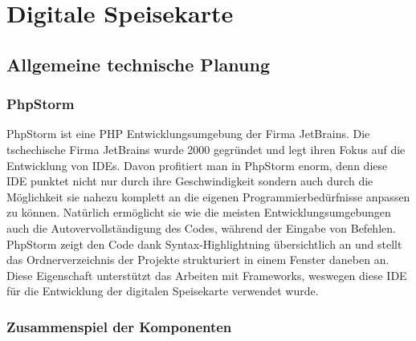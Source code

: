 \chapter{Digitale Speisekarte}
\renewcommand{\kapitelautor}{Autor: Katharina Joksch}

\section{Allgemeine technische Planung}

  \subsection{PhpStorm}

PhpStorm ist eine PHP Entwicklungsumgebung der Firma JetBrains. Die tschechische Firma JetBrains wurde 2000 gegründet und legt ihren Fokus auf die Entwicklung von IDEs. Davon profitiert man in PhpStorm enorm, denn diese IDE punktet nicht nur durch ihre Geschwindigkeit sondern auch durch die Möglichkeit sie nahezu komplett an die eigenen Programmierbedürfnisse anpassen zu können. Natürlich ermöglicht sie wie die meisten Entwicklungsumgebungen auch die Autovervollständigung des Codes, während der Eingabe von Befehlen. PhpStorm zeigt den Code dank Syntax-Highlightning übersichtlich an und stellt das Ordnerverzeichnis der Projekte strukturiert in einem Fenster daneben an. Diese Eigenschaft unterstützt das Arbeiten mit Frameworks, weswegen diese IDE für die Entwicklung der digitalen Speisekarte verwendet wurde.

  \subsection{Zusammenspiel der Komponenten}

